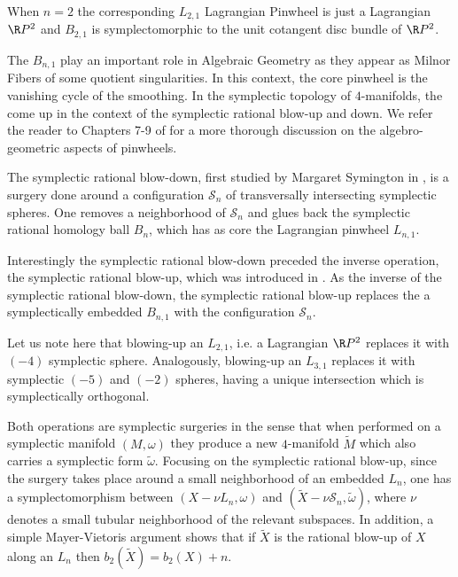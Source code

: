 When $n=2$ the corresponding $L_{2,1}$ Lagrangian Pinwheel is just a Lagrangian $\R P^2$ and  $B_{2,1}$ is symplectomorphic to the unit cotangent disc bundle of $\R P^2$. \par

The $B_{n,1}$ play an important role in Algebraic Geometry as they appear as Milnor Fibers of some quotient singularities. In this context, the core pinwheel is the vanishing cycle of the smoothing. In the symplectic topology of $4$-manifolds, the come up in the context of the symplectic rational blow-up and down. We refer the reader to Chapters 7-9 of \cite{evans_2023} for a more thorough discussion on the algebro-geometric aspects of pinwheels.\par

The symplectic rational blow-down, first studied by Margaret Symington in \cite{Sym}, is a surgery done around a configuration $\mathcal{S}_n$ of transversally intersecting symplectic spheres. One removes a neighborhood of $\mathcal{S}_n$ and glues back the symplectic rational homology ball $B_n$, which has as core the Lagrangian pinwheel $L_{n,1}$.  \par 

 

Interestingly the symplectic rational blow-down preceded the inverse operation, the symplectic rational blow-up, which was introduced in \cite{khodorovskiy2013symplectic}. As the inverse of the symplectic rational blow-down, the symplectic rational blow-up replaces the a symplectically embedded $B_{n,1}$ with the configuration $\mathcal{S}_n$.\par

Let us note here that blowing-up an $L_{2,1}$, i.e. a Lagrangian $\R P^2$ replaces it with $(-4)$ symplectic sphere. Analogously, blowing-up an $L_{3,1}$ replaces it with symplectic $(-5)$ and $(-2)$ spheres, having a unique intersection which is symplectically orthogonal. 

Both operations are symplectic surgeries in the sense that when performed on a symplectic manifold $(M,\omega)$ they produce a new $4$-manifold $\widetilde{M}$ which also carries a symplectic form $\tilde{\omega}$. Focusing on the symplectic rational blow-up, since the surgery takes place around a small neighborhood of an embedded $L_n$, one has a symplectomorphism between $(X-\nu L_n,\omega)$ and $(\widetilde{X}-\nu\mathcal{S}_n,\tilde{\omega})$, where $\nu$ denotes a small tubular neighborhood of the relevant subspaces. In addition, a simple Mayer-Vietoris argument shows that if $\widetilde{X}$ is the rational blow-up of $X$ along an $L_{n}$ then $b_2(\widetilde{X})=b_2(X)+n$.\par








